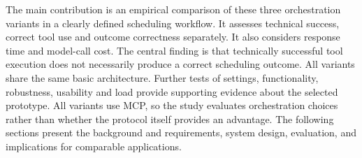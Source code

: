 The main contribution is an empirical comparison of these three orchestration variants in a clearly defined scheduling workflow.
It assesses technical success, correct tool use and outcome correctness separately.
It also considers response time and model-call cost.
The central finding is that technically successful tool execution does not necessarily produce a correct scheduling outcome.
All variants share the same basic architecture.
Further tests of settings, functionality, robustness, usability and load provide supporting evidence about the selected prototype.
All variants use MCP, so the study evaluates orchestration choices rather than whether the protocol itself provides an advantage.
The following sections present the background and requirements, system design, evaluation, and implications for comparable applications.
